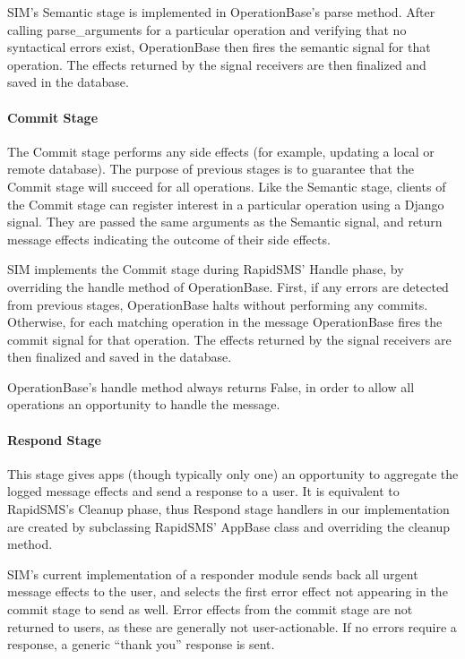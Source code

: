 \documentclass{acm_proc_article-sp}
\begin{document}
SIM's Semantic stage is implemented in OperationBase's parse method. After calling parse\_arguments for a particular operation and verifying that no syntactical errors exist, OperationBase then fires the semantic signal for that operation. The effects returned by the signal receivers are then finalized and saved in the database.

\paragraph{Commit Stage}

The Commit stage performs any side effects (for example, updating a local or remote database). The purpose of previous stages is to guarantee that the Commit stage will succeed for all operations. Like the Semantic stage, clients of the Commit stage can register interest in a particular operation using a Django signal. They are passed the same arguments as the Semantic signal, and return message effects indicating the outcome of their side effects.

SIM implements the Commit stage during RapidSMS' Handle phase, by overriding the handle method of OperationBase. First, if any errors are detected from previous stages, OperationBase halts without performing any commits. Otherwise, for each matching operation in the message OperationBase fires the commit signal for that operation. The effects returned by the signal receivers are then finalized and saved in the database.

OperationBase's handle method always returns False, in order to allow all operations an opportunity to handle the message.

\paragraph{Respond Stage}

This stage gives apps (though typically only one) an opportunity to aggregate the logged message effects and send a response to a user. It  is equivalent to RapidSMS's Cleanup phase, thus Respond stage handlers in our implementation are created by subclassing RapidSMS' AppBase class and overriding the cleanup method.

SIM's current implementation of a responder module sends back all urgent message effects to the user, and selects the first error effect not appearing in the commit stage to send as well. Error effects from the commit stage are not returned to users, as these are generally not user-actionable. If no errors require a response, a generic ``thank you'' response is sent.
\end{document}
